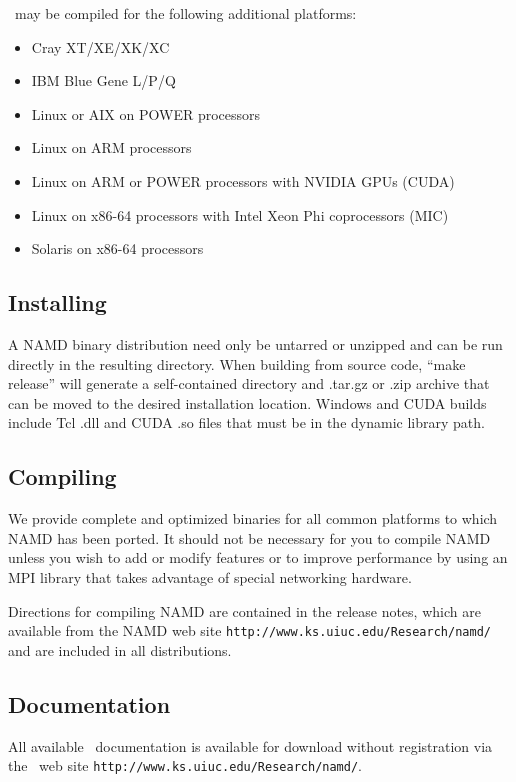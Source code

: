 \NAMD\ may be compiled for the following additional platforms:

\begin{itemize}
\item Cray XT/XE/XK/XC
\item IBM Blue Gene L/P/Q
\item Linux or AIX on POWER processors
\item Linux on ARM processors
\item Linux on ARM or POWER processors with NVIDIA GPUs (CUDA)
\item Linux on x86-64 processors with Intel Xeon Phi coprocessors (MIC)
\item Solaris on x86-64 processors
\end{itemize}

\subsection{Installing \NAMD}

A NAMD binary distribution need only be untarred or unzipped and can
be run directly in the resulting directory.  When building from source
code, ``make release'' will generate a
self-contained directory and .tar.gz or .zip archive that can be moved
to the desired installation location.  Windows and CUDA builds include
Tcl .dll and CUDA .so files that must be in the dynamic library path.

\subsection{Compiling \NAMD}

We provide complete and optimized binaries for all
common platforms to which NAMD has been ported.
It should not be necessary for you to compile
NAMD unless you wish to add or modify features
or to improve performance by using an MPI library
that takes advantage of special networking hardware.

Directions for compiling NAMD are contained in the release notes,
which are available from the NAMD web site
{\tt http://www.ks.uiuc.edu/Research/namd/}
and are included in all distributions.

\subsection{Documentation}

All available \NAMD\ documentation is available for download without
registration via the \NAMD\ web site
{\tt http://www.ks.uiuc.edu/Research/namd/}.


